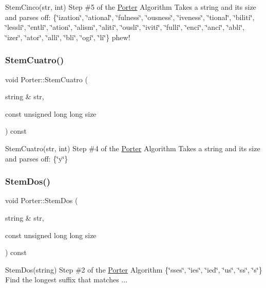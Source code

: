 Stem\+Cinco(str, int) Step \#5 of the \hyperlink{classPorter}{Porter} Algorithm Takes a string and its size and parses off\+: \{\char`\"{}ization\char`\"{}, \char`\"{}ational\char`\"{}, \char`\"{}fulness\char`\"{}, \char`\"{}ousness\char`\"{}, \char`\"{}iveness\char`\"{}, \char`\"{}tional\char`\"{}, \char`\"{}biliti\char`\"{}, \char`\"{}lessli\char`\"{}, \char`\"{}entli\char`\"{}, \char`\"{}ation\char`\"{}, \char`\"{}alism\char`\"{}, \char`\"{}aliti\char`\"{}, \char`\"{}ousli\char`\"{}, \char`\"{}iviti\char`\"{}, \char`\"{}fulli\char`\"{}, \char`\"{}enci\char`\"{}, \char`\"{}anci\char`\"{}, \char`\"{}abli\char`\"{}, \char`\"{}izer\char`\"{}, \char`\"{}ator\char`\"{}, \char`\"{}alli\char`\"{}, \char`\"{}bli\char`\"{}, \char`\"{}ogi\char`\"{}, \char`\"{}li\char`\"{}\} phew! \mbox{\label{classPorter_aa1e1b416311f37b827bc093bb03ca500}} 
\subsubsection{\texorpdfstring{Stem\+Cuatro()}{StemCuatro()}}
{\footnotesize\ttfamily void Porter\+::\+Stem\+Cuatro (\begin{DoxyParamCaption}\item[{string \&}]{str,  }\item[{const unsigned long long}]{size }\end{DoxyParamCaption}) const}

Stem\+Cuatro(str, int) Step \#4 of the \hyperlink{classPorter}{Porter} Algorithm Takes a string and its size and parses off\+: \{\char`\"{}y\char`\"{}\} \mbox{\label{classPorter_a33838d3b5ab4963106a5c47c4a0c74e6}} 
\subsubsection{\texorpdfstring{Stem\+Dos()}{StemDos()}}
{\footnotesize\ttfamily void Porter\+::\+Stem\+Dos (\begin{DoxyParamCaption}\item[{string \&}]{str,  }\item[{const unsigned long long}]{size }\end{DoxyParamCaption}) const}

Stem\+Dos(string) Step \#2 of the \hyperlink{classPorter}{Porter} Algorithm \{\char`\"{}sses\char`\"{}, \char`\"{}ies\char`\"{}, \char`\"{}ied\char`\"{}, \char`\"{}us\char`\"{}, \char`\"{}ss\char`\"{}, \char`\"{}s\char`\"{}\} Find the longest suffix that matches ... \mbox{\label{classPorter_a61853073641e47863fc6a85c786d8737}} 
